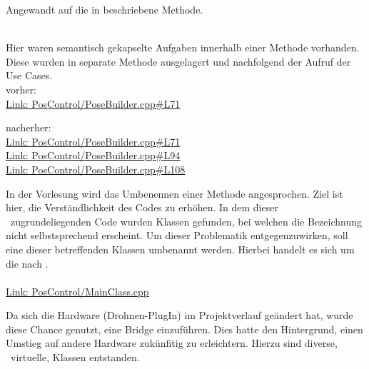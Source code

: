 Angewandt auf die in  beschriebene Methode.\\
\\
 

Hier waren semantisch gekapselte Aufgaben innerhalb einer Methode vorhanden. Diese wurden in separate Methode ausgelagert und nachfolgend der Aufruf der Use Cases.\\
vorher:\\
\href{https://github.com/MobMonRob/ROSLabDrohne/blob/ea7d3d0640e8cde5156c6604e2432fa71061914b/Code/PosControl/src/PoseBuilder.cpp\#L71}{Link: PosControl/PoseBuilder.cpp\#L71}

nacherher:\\
\href{https://github.com/MobMonRob/ROSLabDrohne/blob/9dd6821a9c63bf1682806b8ab319d6004247d3ca/Code/PosControl/src/PoseBuilder.cpp\#L71}{Link: PosControl/PoseBuilder.cpp\#L71}\\
\href{https://github.com/MobMonRob/ROSLabDrohne/blob/9dd6821a9c63bf1682806b8ab319d6004247d3ca/Code/PosControl/src/PoseBuilder.cpp\#L94}{Link: PosControl/PoseBuilder.cpp\#L94}\\
\href{https://github.com/MobMonRob/ROSLabDrohne/blob/9dd6821a9c63bf1682806b8ab319d6004247d3ca/Code/PosControl/src/PoseBuilder.cpp\#L108}{Link: PosControl/PoseBuilder.cpp\#L108}


In der Vorlesung wird das Umbenennen einer Methode angesprochen. Ziel ist hier, die Verständlichkeit des Codes zu erhöhen.
In dem dieser \Arbeit\ zugrundeliegenden Code wurden Klassen gefunden, bei welchen die Bezeichnung nicht selbstsprechend erscheint. Um dieser Problematik entgegenzuwirken, soll eine dieser betreffenden Klassen umbenannt werden. Hierbei handelt es sich um die  nach  .\\
\\
\href{https://github.com/MobMonRob/ROSLabDrohne/blob/3c5aeed610150bd19f75241af48a2777cb4c582a/Code/PosControl/src/MainClass.cpp}{Link: PosControl/MainClass.cpp}




Da sich die Hardware (Drohnen-PlugIn) im Projektverlauf geändert hat, wurde diese Chance genutzt, eine Bridge einzuführen. Dies hatte den Hintergrund, einen Umstieg auf andere Hardware zukünfitig zu erleichtern.
Hierzu sind diverse, \tw\ virtuelle\footnotemark[1], Klassen entstanden.

























